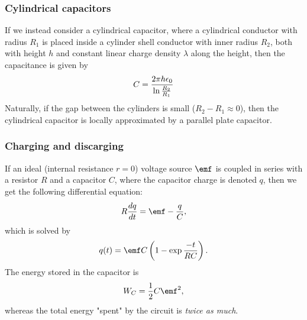     \subsubsection{Cylindrical capacitors}
        If we instead consider a cylindrical capacitor, 
        where a cylindrical conductor with radius $R_1$ is placed inside a cylinder shell conductor with inner radius $R_2$, 
        both with height $h$ and constant linear charge density $\lambda$ along the height, then the capacitance is given by 
        \begin{equation}
            C = \frac{2\pi h \epsilon_0}{\ln{\frac{R_2}{R_1}}}
        \end{equation}
        Naturally, if the gap between the cylinders is small ($R_2 - R_1 \approx 0$), 
        then the cylindrical capacitor is locally approximated by a parallel plate capacitor.

    \subsubsection{Charging and discarging}
        If an ideal (internal resistance $r=0$) voltage source $\emf$ is coupled in series with a resistor $R$ 
        and a capacitor $C$, where the capacitor charge is denoted $q$, then we get the following differential equation: 
        \begin{equation}
            R\frac{dq}{dt} = \emf - \frac{q}{C},
        \end{equation}
        which is solved by
        \begin{equation}
            q(t) = \emf C \left(1-\exp{\frac{-t}{RC}}\right).
        \end{equation}
        The energy stored in the capacitor is 
        \begin{equation}
            W_C = \frac{1}{2}C\emf^2,
        \end{equation}
        whereas the total energy "spent" by the circuit is \textit{twice as much}.